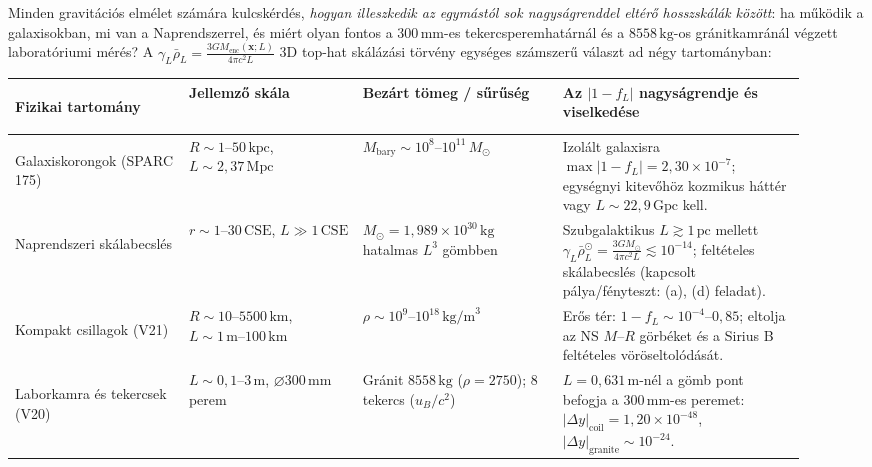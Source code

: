 \documentclass[10pt,a4paper]{article}
\begin{document}
\par
Minden gravit\'aci\'os elm\'elet sz\'am\'ara kulcsk\'erd\'es, \emph{hogyan illeszkedik az egym\'ast\'ol sok nagys\'agrenddel elt\'er\H{o} hosszsk\'al\'ak k\"oz\"ott}: ha m\H{u}k\"odik a galaxisokban, mi van a Naprendszerrel, \'es mi\'ert olyan fontos a $300\,\text{mm}$-es tekercsperemhat\'arn\'al \'es a $8558\,\text{kg}$-os gr\'anitkamr\'an\'al v\'egzett laborat\'oriumi m\'er\'es? A $\gamma_L \bar{\rho}_L = \frac{3 G M_{\text{enc}}(\mathbf{x};L)}{4\pi c^2 L}$ 3D top-hat sk\'al\'az\'asi t\"orv\'eny egys\'eges sz\'amszer\H{u} v\'alaszt ad n\'egy tartom\'anyban:
\begin{center}\vspace{-2pt}
{\footnotesize
\begin{tabular}{@{}>{\bfseries\raggedright\arraybackslash}p{0.20\linewidth}>{\raggedright\arraybackslash}p{0.20\linewidth}>{\raggedright\arraybackslash}p{0.23\linewidth}>{\raggedright\arraybackslash}p{0.29\linewidth}@{}}
\toprule
Fizikai tartom\'any & Jellemz\H{o} sk\'ala & Bez\'art t\"omeg / s\H{u}r\H{u}s\'eg & Az $|1 - f_L|$ nagys\'agrendje \'es viselked\'ese \\
\midrule
Galaxiskorongok (SPARC 175) & $R \sim 1\text{--}50\,\text{kpc}$, $L \sim 2{,}37\,\text{Mpc}$ & $M_{\text{bary}} \sim 10^8\text{--}10^{11}\,M_\odot$ & Izol\'alt galaxisra $\max|1-f_L| = 2{,}30\times 10^{-7}$; egys\'egnyi kitev\H{o}h\"oz kozmikus h\'att\'er vagy $L\sim 22{,}9\,\text{Gpc}$ kell. \\
Naprendszeri sk\'alabecsl\'es & $r \sim 1\text{--}30\,\text{CSE}$, $L \gg 1\,\text{CSE}$ & $M_\odot = 1{,}989\times 10^{30}\,\text{kg}$ hatalmas $L^3$ g\"ombben & Szubgalaktikus $L \gtrsim 1\,\text{pc}$ mellett $\gamma_L\bar{\rho}_L^\odot = \frac{3GM_\odot}{4\pi c^2 L} \lesssim 10^{-14}$; felt\'eteles sk\'alabecsl\'es (kapcsolt p\'alya/f\'enyteszt: (a), (d) feladat). \\
Kompakt csillagok (V21) & $R \sim 10\text{--}5500\,\text{km}$, $L \sim 1\,\text{m}\text{--}100\,\text{km}$ & $\rho \sim 10^9\text{--}10^{18}\,\text{kg/m}^3$ & Er\H{o}s t\'er: $1-f_L \sim 10^{-4}\text{--}0{,}85$; eltolja az NS $M$--$R$ g\"orb\'eket \'es a Sirius B felt\'eteles v\"or\"oseltol\'od\'as\'at. \\
Laborkamra \'es tekercsek (V20) & $L \sim 0{,}1\text{--}3\,\text{m}$, $\varnothing 300\,\text{mm}$ perem & Gr\'anit $8558\,\text{kg}$ ($\rho=2750$); 8 tekercs ($u_B/c^2$) & $L=0{,}631\,\text{m}$-n\'el a g\"omb pont befogja a $300\,\text{mm}$-es peremet: $|\Delta y|_{\text{coil}}=1{,}20\times 10^{-48}$, $|\Delta y|_{\text{granite}}\sim 10^{-24}$. \\
\bottomrule
\end{tabular}}
\end{center}
\end{document}
